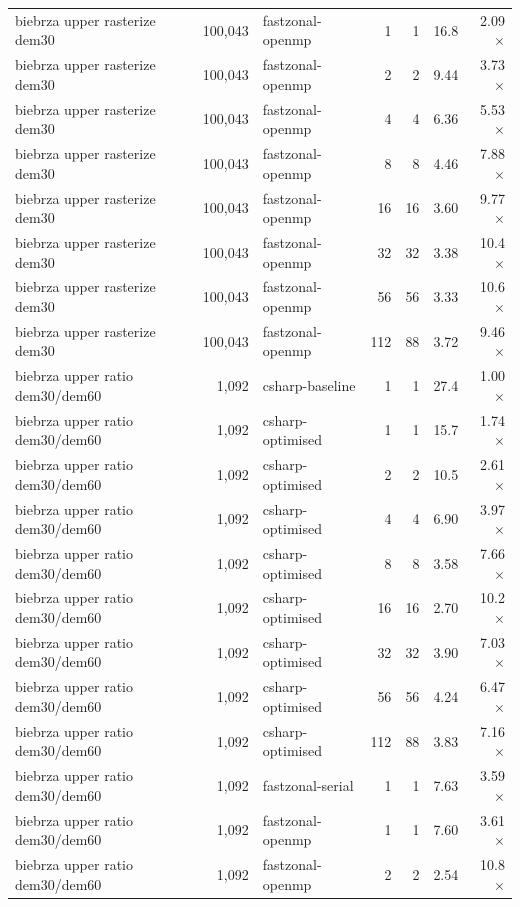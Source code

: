 \begin{tabular}{lrlrrrr}
biebrza upper rasterize dem30 & 100,043 & fastzonal-openmp & 1 & 1 & 16.8 & 2.09$\times$ \\
biebrza upper rasterize dem30 & 100,043 & fastzonal-openmp & 2 & 2 & 9.44 & 3.73$\times$ \\
biebrza upper rasterize dem30 & 100,043 & fastzonal-openmp & 4 & 4 & 6.36 & 5.53$\times$ \\
biebrza upper rasterize dem30 & 100,043 & fastzonal-openmp & 8 & 8 & 4.46 & 7.88$\times$ \\
biebrza upper rasterize dem30 & 100,043 & fastzonal-openmp & 16 & 16 & 3.60 & 9.77$\times$ \\
biebrza upper rasterize dem30 & 100,043 & fastzonal-openmp & 32 & 32 & 3.38 & 10.4$\times$ \\
biebrza upper rasterize dem30 & 100,043 & fastzonal-openmp & 56 & 56 & 3.33 & 10.6$\times$ \\
biebrza upper rasterize dem30 & 100,043 & fastzonal-openmp & 112 & 88 & 3.72 & 9.46$\times$ \\
biebrza upper ratio dem30/dem60 & 1,092 & csharp-baseline & 1 & 1 & 27.4 & 1.00$\times$ \\
biebrza upper ratio dem30/dem60 & 1,092 & csharp-optimised & 1 & 1 & 15.7 & 1.74$\times$ \\
biebrza upper ratio dem30/dem60 & 1,092 & csharp-optimised & 2 & 2 & 10.5 & 2.61$\times$ \\
biebrza upper ratio dem30/dem60 & 1,092 & csharp-optimised & 4 & 4 & 6.90 & 3.97$\times$ \\
biebrza upper ratio dem30/dem60 & 1,092 & csharp-optimised & 8 & 8 & 3.58 & 7.66$\times$ \\
biebrza upper ratio dem30/dem60 & 1,092 & csharp-optimised & 16 & 16 & 2.70 & 10.2$\times$ \\
biebrza upper ratio dem30/dem60 & 1,092 & csharp-optimised & 32 & 32 & 3.90 & 7.03$\times$ \\
biebrza upper ratio dem30/dem60 & 1,092 & csharp-optimised & 56 & 56 & 4.24 & 6.47$\times$ \\
biebrza upper ratio dem30/dem60 & 1,092 & csharp-optimised & 112 & 88 & 3.83 & 7.16$\times$ \\
biebrza upper ratio dem30/dem60 & 1,092 & fastzonal-serial & 1 & 1 & 7.63 & 3.59$\times$ \\
biebrza upper ratio dem30/dem60 & 1,092 & fastzonal-openmp & 1 & 1 & 7.60 & 3.61$\times$ \\
biebrza upper ratio dem30/dem60 & 1,092 & fastzonal-openmp & 2 & 2 & 2.54 & 10.8$\times$ \\

\end{tabular}
